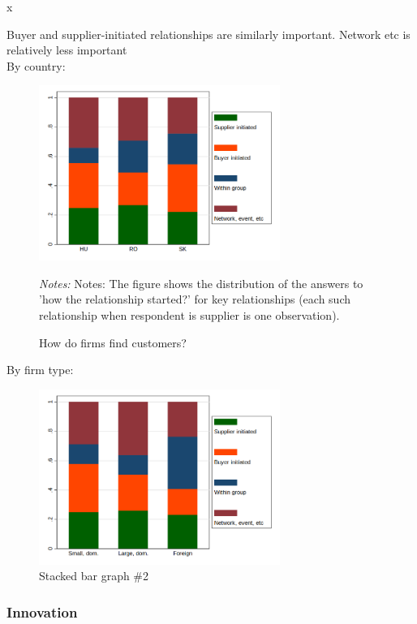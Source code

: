 x\documentclass[final, dvipsnames, authoryear,12pt]{elsarticle}
\begin{document}
Buyer and supplier-initiated relationships are similarly important. Network etc is relatively less important\\
By country:
\begin{figure}[!h]
    \caption{How do firms find customers?}
    \label{fig:rel_form1}
    \begin{center}
    \includegraphics[width=0.7\textwidth]{graphs/Table6a.png}
    \end{center}{}    
       {\footnotesize \textit{Notes:} Notes: The figure shows the distribution of the answers to ’how the relationship started?’ for key relationships (each such relationship when respondent is supplier is one observation).} 
\end{figure}
By firm type:
\begin{figure}[!h]
    \centering
    \includegraphics[width=0.7\textwidth]{graphs/Table6b.png}
    \caption{Stacked bar graph \#2}
    \label{fig:my_label}
\end{figure}


\subsubsection{Innovation}
\end{document}
